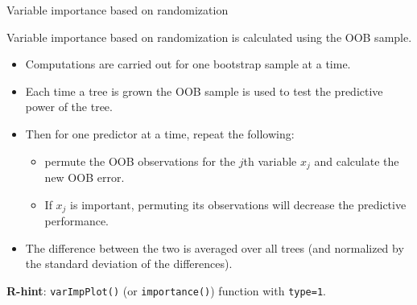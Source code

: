\documentclass[10pt,ignorenonframetext,]{beamer}
\providecommand{\tightlist}{%
  \setlength{\itemsep}{0pt}\setlength{\parskip}{0pt}}
\begin{document}
\begin{frame}[fragile]

\begin{block}{Variable importance based on randomization}

\vspace{2mm}

Variable importance based on randomization is calculated using the OOB
sample. \vspace{1mm}

\begin{itemize}
\tightlist
\item
  Computations are carried out for one bootstrap sample at a time.
\item
  Each time a tree is grown the OOB sample is used to test the
  predictive power of the tree.
\item
  Then for one predictor at a time, repeat the following:

  \begin{itemize}
  \tightlist
  \item
    permute the OOB observations for the \(j\)th variable \(x_j\) and
    calculate the new OOB error.
  \item
    If \(x_j\) is important, permuting its observations will decrease
    the predictive performance.
  \end{itemize}
\item
  The difference between the two is averaged over all trees (and
  normalized by the standard deviation of the differences).
\end{itemize}

\vspace{4mm}

\textbf{R-hint}: \texttt{varImpPlot()} (or \texttt{importance()})
function with \texttt{type=1}.

\end{block}

\end{frame}
\end{document}
